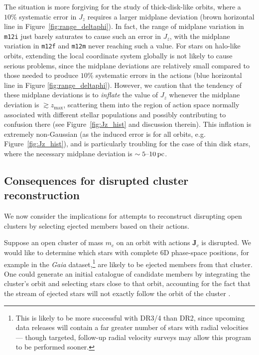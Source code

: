 \documentclass[twocolumn]{aastex62}
\newcommand{\pc}{\text{pc}}
\newcommand{\mi}{\texttt{m12i}}
\newcommand{\mf}{\texttt{m12f}}
\newcommand{\mm}{\texttt{m12m}}
\newcommand{\thickcolor}{brown}
\newcommand{\halocolor}{blue}
\begin{document}
The situation is more forgiving for the study of thick-disk-like orbits, where
a $10\%$ systematic error in $J_z$ requires a larger midplane
deviation (\thickcolor{} horizontal line in Figure~\ref{fig:range_deltaphi}).
In fact, the range of midplane variation in \mi{} just barely saturates to
cause such an error in $J_z$, with the midplane variation in \mf{} and \mm{}
never reaching such a value. For stars on halo-like orbits, extending the
local coordinate system globally is not likely to cause serious problems,
since the midplane deviations are relatively small compared to those needed to
produce $10\%$ systematic errors in the actions (\halocolor{}
horizontal line in Figure \ref{fig:range_deltaphi}). However, we caution that
the tendency of these midplane deviations is to \emph{inflate} the value of
$J_z$ whenever the midplane deviation is $\gtrsim z_{\text{max}}$, scattering
them into the region of action space normally associated with different
stellar populations and possibly contributing to confusion there (see
Figure~\ref{fig:Jz_hist} and discussion therein). This inflation is extremely
non-Gaussian (as the induced error is for all orbits, e.g.
Figure~\ref{fig:Jz_hist}), and is particularly troubling for the case of thin
disk stars, where the necessary midplane deviation is
$\sim5\textup{--}10\,\pc$.

\subsection{Consequences for disrupted cluster reconstruction}
\label{sssec:reconstruction}

We now consider the implications for attempts to reconstruct disrupting open
clusters by selecting ejected members based on their actions.

Suppose an open cluster of mass $m_c$ on an orbit with actions $\bm{J}_c$ is
disrupted. We would like to determine which stars with complete 6D phase-space
positions, for example in the {\em Gaia} dataset,\footnote{This is likely to
be more successful with DR3/4 than DR2, since upcoming data releases will
contain a far greater number of stars with radial velocities --- though
targeted, follow-up radial velocity surveys may allow this program to be
performed sooner.} are likely to be ejected members from that cluster. One
could generate an initial catalogue of candidate members by integrating the
cluster's orbit and selecting stars close to that orbit, accounting for the
fact that the stream of ejected stars will not exactly follow the orbit of the
cluster \citep[e.g.][]{2011MNRAS.413.1852E}.
\end{document}

